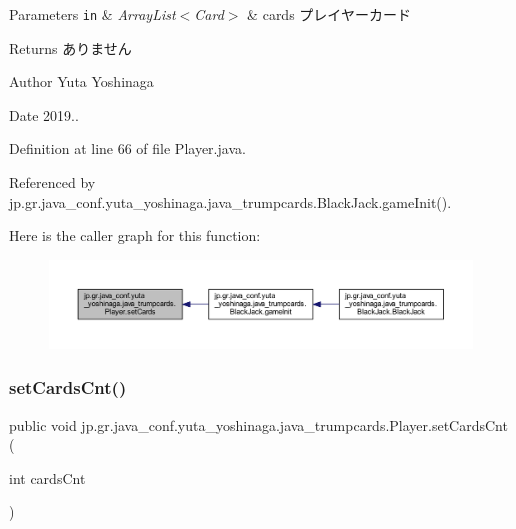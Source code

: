 \begin{DoxyParams}[1]{Parameters}
\mbox{\tt in}  & {\em Array\+List$<$\+Card$>$} & cards プレイヤーカード \\
\hline
\end{DoxyParams}
\begin{DoxyReturn}{Returns}
ありません 
\end{DoxyReturn}
\begin{DoxyAuthor}{Author}
Yuta Yoshinaga 
\end{DoxyAuthor}
\begin{DoxyDate}{Date}
2019.. 
\end{DoxyDate}


Definition at line 66 of file Player.\+java.



Referenced by jp.\+gr.\+java\+\_\+conf.\+yuta\+\_\+yoshinaga.\+java\+\_\+trumpcards.\+Black\+Jack.\+game\+Init().

Here is the caller graph for this function\+:
\nopagebreak
\begin{figure}[H]
\begin{center}
\leavevmode
\includegraphics[width=350pt]{classjp_1_1gr_1_1java__conf_1_1yuta__yoshinaga_1_1java__trumpcards_1_1_player_af3a6a421101b6e8ba60e9578a1b9ec74_icgraph}
\end{center}
\end{figure}
\mbox{\label{classjp_1_1gr_1_1java__conf_1_1yuta__yoshinaga_1_1java__trumpcards_1_1_player_a658b393d95e9658b88c8aedcb44a5728}} 
\subsubsection{\texorpdfstring{set\+Cards\+Cnt()}{setCardsCnt()}}
{\footnotesize\ttfamily public void jp.\+gr.\+java\+\_\+conf.\+yuta\+\_\+yoshinaga.\+java\+\_\+trumpcards.\+Player.\+set\+Cards\+Cnt (\begin{DoxyParamCaption}\item[{int}]{cards\+Cnt }\end{DoxyParamCaption})}




